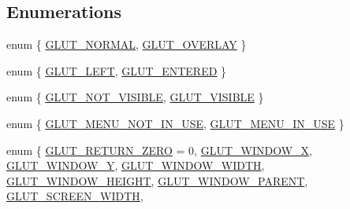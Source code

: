 \subsection*{Enumerations}
\begin{DoxyCompactItemize}
\item 
enum \{ \hyperlink{glut_8_h_aabfcbcb5ac86a1edac4035264bc7d2b8af156afcb315395148a0151ca2ec01087}{G\+L\+U\+T\+\_\+\+N\+O\+R\+M\+AL}, 
\hyperlink{glut_8_h_aabfcbcb5ac86a1edac4035264bc7d2b8a9062ebd4dae14dde6a892ca36b429d6c}{G\+L\+U\+T\+\_\+\+O\+V\+E\+R\+L\+AY}
 \}
\item 
enum \{ \hyperlink{glut_8_h_a5d76b81b0ad4c19007a781d4edb8181fa563dde7b29f2a6d90dd96bb4a74752c5}{G\+L\+U\+T\+\_\+\+L\+E\+FT}, 
\hyperlink{glut_8_h_a5d76b81b0ad4c19007a781d4edb8181fab420a4555d190ca10b700945bb6f7d75}{G\+L\+U\+T\+\_\+\+E\+N\+T\+E\+R\+ED}
 \}
\item 
enum \{ \hyperlink{glut_8_h_aac34dfe6c6b73b43a4656c9dce041034aede6e8b5a96e89ec58ba39cac25bb37e}{G\+L\+U\+T\+\_\+\+N\+O\+T\+\_\+\+V\+I\+S\+I\+B\+LE}, 
\hyperlink{glut_8_h_aac34dfe6c6b73b43a4656c9dce041034ab8823ba4c6f9ca9fd61125af133d22b7}{G\+L\+U\+T\+\_\+\+V\+I\+S\+I\+B\+LE}
 \}
\item 
enum \{ \hyperlink{glut_8_h_a0ed680fdb405e7195d9f14032851eebbac59f7a6a46f4fc3c5c230d4d8ea0acbb}{G\+L\+U\+T\+\_\+\+M\+E\+N\+U\+\_\+\+N\+O\+T\+\_\+\+I\+N\+\_\+\+U\+SE}, 
\hyperlink{glut_8_h_a0ed680fdb405e7195d9f14032851eebba0067dd9b5b5c74d01a198a141da0997f}{G\+L\+U\+T\+\_\+\+M\+E\+N\+U\+\_\+\+I\+N\+\_\+\+U\+SE}
 \}
\item 
enum \{ \newline
\hyperlink{glut_8_h_a0944a4353780132eeab7b06e3e42291dae9a1cdeb1b0b1804ae7e3c0ca5576952}{G\+L\+U\+T\+\_\+\+R\+E\+T\+U\+R\+N\+\_\+\+Z\+E\+RO} = 0, 
\hyperlink{glut_8_h_a0944a4353780132eeab7b06e3e42291daaf740a8179c25cda53eac37532522e93}{G\+L\+U\+T\+\_\+\+W\+I\+N\+D\+O\+W\+\_\+X}, 
\hyperlink{glut_8_h_a0944a4353780132eeab7b06e3e42291dab52a3f3ae56c8f4e68eeb00726e5ef82}{G\+L\+U\+T\+\_\+\+W\+I\+N\+D\+O\+W\+\_\+Y}, 
\hyperlink{glut_8_h_a0944a4353780132eeab7b06e3e42291da428e44d9be658067344083f4b696cb78}{G\+L\+U\+T\+\_\+\+W\+I\+N\+D\+O\+W\+\_\+\+W\+I\+D\+TH}, 
\newline
\hyperlink{glut_8_h_a0944a4353780132eeab7b06e3e42291da619b0febc805b372bfe1e3bfa22705a1}{G\+L\+U\+T\+\_\+\+W\+I\+N\+D\+O\+W\+\_\+\+H\+E\+I\+G\+HT}, 
\hyperlink{glut_8_h_a0944a4353780132eeab7b06e3e42291da9ac3577329aca8aa955cdf0f4fa50038}{G\+L\+U\+T\+\_\+\+W\+I\+N\+D\+O\+W\+\_\+\+P\+A\+R\+E\+NT}, 
\hyperlink{glut_8_h_a0944a4353780132eeab7b06e3e42291da0e3eb29677330c6aa6e550bf73ff36d8}{G\+L\+U\+T\+\_\+\+S\+C\+R\+E\+E\+N\+\_\+\+W\+I\+D\+TH}, 

\end{DoxyCompactItemize}
